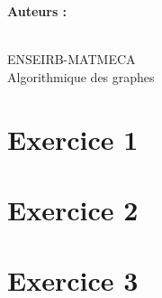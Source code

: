 \documentclass[a4paper,12pt]{article}
\title{\texteTitre}
\author{\texteAuteurs}
\date{\texteDate}
\begin{document}


\hypersetup{pageanchor=false}
\begin{titlepage}
    \centering

    \vspace*{1.5cm}

    {\Huge\bfseries \texteNumero\par}

    \vspace{0.8cm}

    {\LARGE \texteTitre \par}

    \vspace{7cm}

    {\Large
    \textbf{Auteurs :}\\
    \texteAuteurs\par}

    \vfill

    {\large
    \texteDate\\
    ENSEIRB-MATMECA\\
    Algorithmique des graphes
    \par}

    \vspace{1cm}

\end{titlepage}
\hypersetup{pageanchor=true} %


\section{Exercice 1}

\section{Exercice 2}

\section{Exercice 3}

\end{document}
